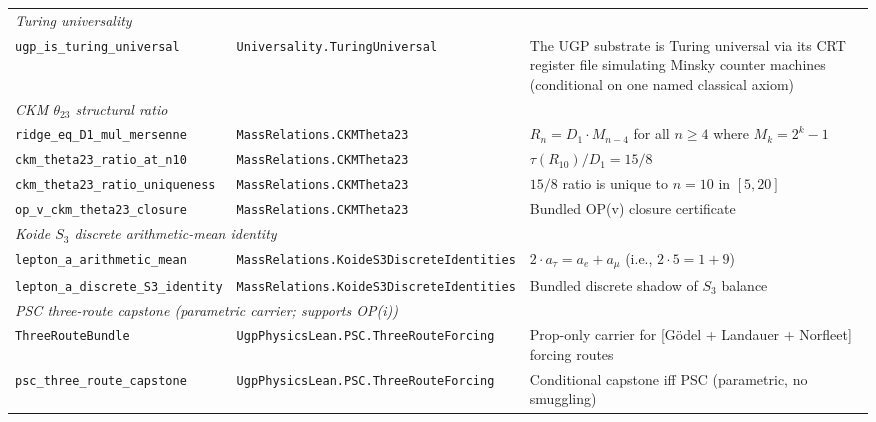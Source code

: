 \documentclass[10pt]{article}
\begin{document}
\begin{longtable}{@{} p{3.8cm} p{4.8cm} p{4.8cm} @{}}
\multicolumn{3}{l}{\textit{Turing universality}} \\[2pt]
\nolinkurl{ugp_is_turing_universal} & \nolinkurl{Universality.TuringUniversal} & The UGP substrate is Turing universal via its CRT register file simulating Minsky counter machines (conditional on one named classical axiom) \\[6pt]

\multicolumn{3}{l}{\textit{CKM $\theta_{23}$ structural ratio}} \\[2pt]
\nolinkurl{ridge_eq_D1_mul_mersenne} & \nolinkurl{MassRelations.CKMTheta23} & $R_n = D_1 \cdot M_{n-4}$ for all $n \ge 4$ where $M_k = 2^k - 1$ \\
\nolinkurl{ckm_theta23_ratio_at_n10} & \nolinkurl{MassRelations.CKMTheta23} & $\tau(R_{10})/D_1 = 15/8$ \\
\nolinkurl{ckm_theta23_ratio_uniqueness} & \nolinkurl{MassRelations.CKMTheta23} & $15/8$ ratio is unique to $n = 10$ in $[5, 20]$ \\
\nolinkurl{op_v_ckm_theta23_closure} & \nolinkurl{MassRelations.CKMTheta23} & Bundled OP(v) closure certificate \\[4pt]

\multicolumn{3}{l}{\textit{Koide $S_3$ discrete arithmetic-mean identity}} \\[2pt]
\nolinkurl{lepton_a_arithmetic_mean} & \nolinkurl{MassRelations.KoideS3DiscreteIdentities} & $2 \cdot a_\tau = a_e + a_\mu$ (i.e., $2 \cdot 5 = 1 + 9$) \\
\nolinkurl{lepton_a_discrete_S3_identity} & \nolinkurl{MassRelations.KoideS3DiscreteIdentities} & Bundled discrete shadow of $S_3$ balance \\[4pt]

\multicolumn{3}{l}{\textit{PSC three-route capstone (parametric carrier; supports OP(i))}} \\[2pt]
\nolinkurl{ThreeRouteBundle} & \nolinkurl{UgpPhysicsLean.PSC.ThreeRouteForcing} & Prop-only carrier for [G\"odel + Landauer + Norfleet] forcing routes \\
\nolinkurl{psc_three_route_capstone} & \nolinkurl{UgpPhysicsLean.PSC.ThreeRouteForcing} & Conditional capstone iff PSC (parametric, no smuggling) \\

\end{longtable}
\end{document}
